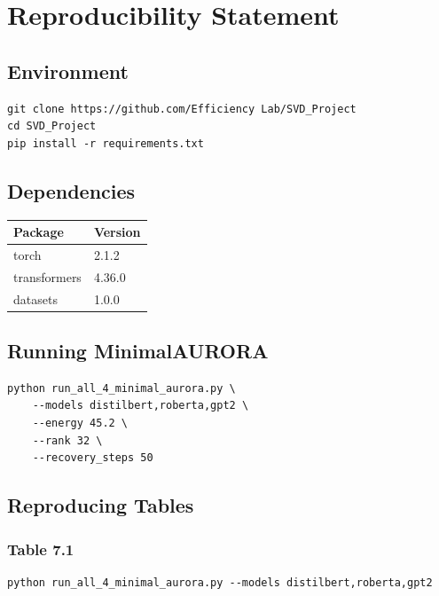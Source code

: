 \section{Reproducibility Statement}

\subsection{Environment}

\begin{lstlisting}
git clone https://github.com/Efficiency Lab/SVD_Project
cd SVD_Project
pip install -r requirements.txt
\end{lstlisting}

\subsection{Dependencies}

\begin{table}[H]
\centering
\small
\begin{tabular}{ll}
\toprule
\textbf{Package} & \textbf{Version} \\
\midrule
torch & 2.1.2 \\
transformers & 4.36.0 \\
datasets & 1.0.0 \\
\bottomrule
\end{tabular}
\end{table}

\subsection{Running MinimalAURORA}

\begin{lstlisting}
python run_all_4_minimal_aurora.py \
    --models distilbert,roberta,gpt2 \
    --energy 45.2 \
    --rank 32 \
    --recovery_steps 50
\end{lstlisting}

\subsection{Reproducing Tables}

\subsubsection{Table 7.1}
\begin{lstlisting}
python run_all_4_minimal_aurora.py --models distilbert,roberta,gpt2
\end{lstlisting}

